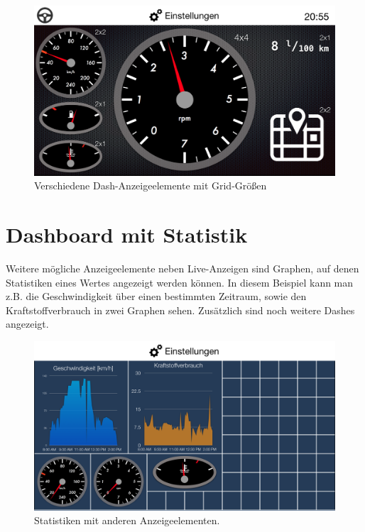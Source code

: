 \documentclass[pflichtenheft.tex]{subfiles}
\begin{document}
\begin{figure}[H]
  	\begin{center}
 		\includegraphics[width=\textwidth]{Images/GUI-DashboardSize.png}
  		\caption{Verschiedene Dash-Anzeigeelemente mit Grid-Größen}
  	\end{center}
\end{figure}

\clearpage
\section{Dashboard mit Statistik}

Weitere mögliche Anzeigeelemente neben Live-Anzeigen sind Graphen, auf denen Statistiken eines Wertes angezeigt werden können. In diesem Beispiel kann man z.B. die Geschwindigkeit über einen bestimmten Zeitraum, sowie den Kraftstoffverbrauch in zwei Graphen sehen. Zusätzlich sind noch weitere Dashes angezeigt.
\begin{figure}[H]
  	\begin{center}
 		\includegraphics[width=\textwidth]{Images/GUI-DashboardStatistic.png}
  		\caption{Statistiken mit anderen Anzeigeelementen.}
  	\end{center}
\end{figure}
\end{document}

